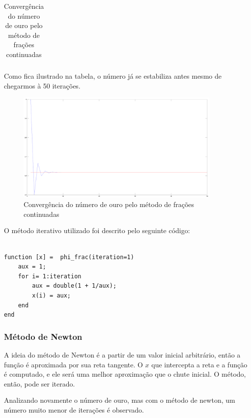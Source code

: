 \documentclass[a4paper]{article}
\begin{document}
\begin{table}[H]
\begin{tabular}{|c|c|c|c|}
	\end{tabular}
	\label{golden_fraction}
	\caption{Convergência do número de ouro pelo método de frações continuadas}
\end{table}

Como fica ilustrado na tabela, o número já se estabiliza antes mesmo de
chegarmos à 50 iterações.

\begin{figure}[H]
    \centering
    \includegraphics[width=100mm]{golden_frac.png}
    \caption{Convergência do número de ouro pelo método de frações continuadas}
    \label{golden_frac}
\end{figure}


O método iterativo utilizado foi descrito pelo seguinte código:

\begin{lstlisting}

function [x] =  phi_frac(iteration=1)
	aux = 1;
	for i= 1:iteration
		aux = double(1 + 1/aux);
		x(i) = aux;
	end
end

\end{lstlisting}

\subsubsection{Método de Newton}

A ideia do método de Newton é a partir de um valor inicial arbitrário, então a
função é aproximada por sua reta tangente. O $x$ que intercepta a reta e a
função é computado, e ele será uma melhor aproximação que o chute inicial. O
método, então, pode ser iterado.

Analizando novamente o número de ouro, mas com o método de newton, um número
muito menor de iterações é observado.
\end{document}
